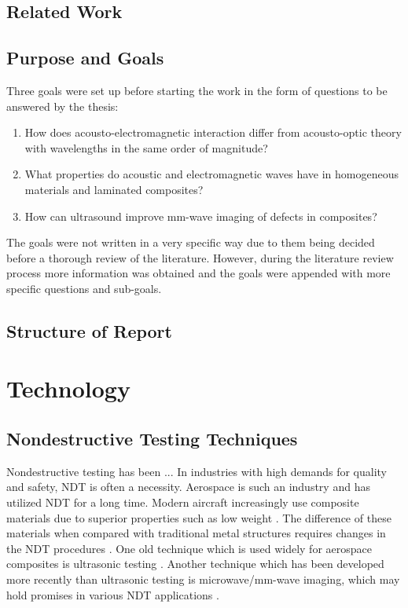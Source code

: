 \documentclass[11pt,twoside]{eitExjobb}
\begin{document}
	\section{Related Work}
	
	\section{Purpose and Goals}
	Three goals were set up before starting the work in the form of questions to be answered by the thesis:
	\begin{enumerate}
		\item How does acousto-electromagnetic interaction differ from acousto-optic theory with wavelengths in the same order of magnitude?
		\item What properties do acoustic and electromagnetic waves have in homogeneous materials and laminated composites?
		\item How can ultrasound improve mm-wave imaging of defects in composites?
	\end{enumerate}
	The goals were not written in a very specific way due to them being decided before a thorough review of the literature. However, during the literature review process more information was obtained and the goals were appended with more specific questions and sub-goals.
	
	\section{Structure of Report}
	
	\chapter{Technology \label{sh:tech}}
	
	\section{Nondestructive Testing Techniques}
	Nondestructive testing has been ... In industries with high demands for quality and safety, NDT is often a necessity. Aerospace is such an industry and has utilized NDT for a long time. \addref Modern aircraft increasingly use composite materials due to superior properties such as low weight \cite{Katunin2015}. The difference of these materials when compared with traditional metal structures requires changes in the NDT procedures \cite{Riegert2006}. One old technique which is used widely for aerospace composites is ultrasonic testing \cite{Garnier2011}. Another technique which has been developed more recently than ultrasonic testing is microwave/mm-wave imaging, which may hold promises in various NDT applications \cite{Kharkovsky2007}.
	
\end{document}
